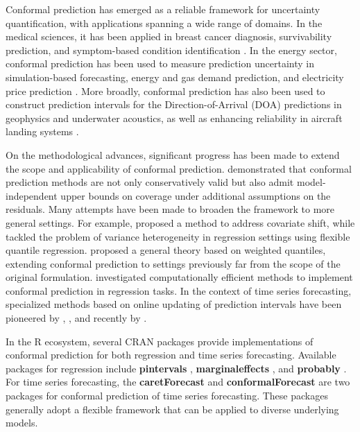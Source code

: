 Conformal prediction has emerged as a reliable framework for uncertainty
quantification, with applications spanning a wide range of domains. In
the medical sciences, it has been applied in breast cancer diagnosis,
survivability prediction, and symptom-based condition identification
\citep{vazquez2022}. In the energy sector, conformal prediction has been used
to measure prediction uncertainty in simulation-based forecasting,
energy and gas demand prediction, and electricity price prediction \citep[e.g.,][]{mendil22a}. More broadly, conformal prediction has also been used to construct
prediction intervals for the Direction-of-Arrival (DOA) predictions in
geophysics and underwater acoustics, as well as
enhancing reliability in aircraft landing systems \citep{vilfroy2024}.

On the methodological advances, significant progress has been made to
extend the scope and applicability of conformal prediction. \citet{lei2018}
demonstrated that conformal prediction methods are not only
conservatively valid but also admit model-independent upper bounds on
coverage under additional assumptions on the residuals. Many attempts have been made to broaden the framework to more
general settings. For example, \citet{tibshirani2019} proposed a method to
address covariate shift, while \citet{romano2019} tackled the problem of
variance heterogeneity in regression settings using flexible quantile
regression. \citet{barber2023} proposed a general theory based on weighted
quantiles, extending conformal prediction to settings previously far
from the scope of the original formulation. \citet{chen2018} investigated
computationally efficient methods to implement conformal prediction in
regression tasks. In the context of time series forecasting, specialized
methods based on online updating of prediction intervals have been
pioneered by \citet{Gibbs_Candes_2021}, \citet{zaffran2022}, \citet{Bhatnagar_Wang_Xiong_Bai_2023} and
recently by \citet{Wang_Hyndman_2024}.

In the R ecosystem, several CRAN packages provide implementations of conformal prediction for both regression and time series forecasting. Available packages for regression include \textbf{pintervals} \citep{pintervals},
\textbf{marginaleffects} \citep{marginaleffects}, and \textbf{probably} \citep{probably}. For time series forecasting, the \textbf{caretForecast} \citep{caretForecast} and
\textbf{conformalForecast} \citep{conformalForecast} are two packages for
conformal prediction of time series forecasting. These packages generally adopt a flexible framework that can be applied to diverse underlying models.

